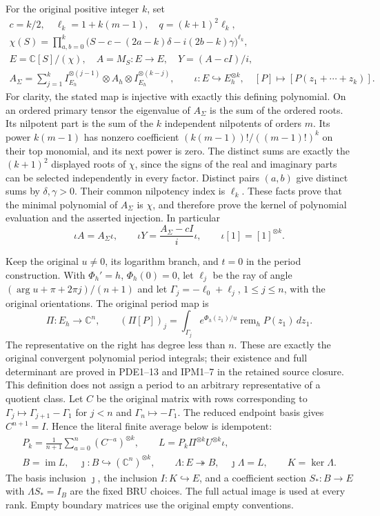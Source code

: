 For the original positive integer $k$, set
\[
\begin{gathered}
 c=k/2,\quad \ell_k=1+k(m-1),\quad q=(k+1)^2\ell_k,\\
 \chi(S)=\prod_{a,b=0}^k
   \bigl(S-c-(2a-k)\delta-i(2b-k)\gamma\bigr)^{\ell_k},\\
 E=\mathbb C[S]/(\chi),\quad A=M_S:E\to E,\quad
 Y=(A-cI)/i,\\
 A_\Sigma=\sum_{j=1}^k
      I_{E_h}^{\otimes(j-1)}\otimes A_h\otimes I_{E_h}^{\otimes(k-j)},
 \qquad
 \iota:E\hookrightarrow E_h^{\otimes k},\quad
 [P]\longmapsto[P(z_1+\cdots+z_k)].
\end{gathered}\tag{OPG2}
\]
For clarity, the stated map is injective with exactly this defining
polynomial. On an ordered primary tensor the eigenvalue of
$A_\Sigma$ is the sum of the ordered roots. Its nilpotent part is
the sum of the $k$ independent nilpotents of orders $m$.
Its power $k(m-1)$ has nonzero coefficient
$(k(m-1))!/((m-1)!)^k$ on their top monomial, and its next power
is zero. The distinct sums are exactly the $(k+1)^2$ displayed
roots of $\chi$, since the signs of the real and imaginary parts
can be selected independently in every factor. Distinct pairs
$(a,b)$ give distinct sums by $\delta,\gamma>0$. Their common
nilpotency index is $\ell_k$. These facts prove that the minimal
polynomial of $A_\Sigma$ is $\chi$, and therefore prove the
kernel of polynomial evaluation and the asserted injection.
In particular
\[
 \iota A=A_\Sigma\iota,\qquad
 \iota Y=\frac{A_\Sigma-cI}{i}\iota,\qquad
 \iota[1]=[1]^{\otimes k}.
 \tag{OPG3}
\]

Keep the original $u\ne0$, its logarithm branch, and $t=0$ in
the period construction. With $\Phi_h'=h$, $\Phi_h(0)=0$,
let $\ell_j$ be the ray of angle
$(\arg u+\pi+2\pi j)/(n+1)$ and let
$\Gamma_j=-\ell_0+\ell_j$, $1\leq j\leq n$, with the original
orientations. The original period map is
\[
 \Pi:E_h\to\mathbb C^n,\qquad
 (\Pi[P])_j=\int_{\Gamma_j}e^{\Phi_h(z_1)/u}
                    \operatorname{rem}_h P(z_1)\,dz_1.
 \tag{OPG4}
\]
The representative on the right has degree less than $n$. These
are exactly the original convergent polynomial period integrals;
their existence and full determinant are proved in PDE1--13 and
IPM1--7 in the retained source closure. This definition does not
assign a period to an arbitrary representative of a quotient class.
Let $C$ be the original matrix with rows corresponding to
$\Gamma_j\mapsto\Gamma_{j+1}-\Gamma_1$ for $j<n$ and
$\Gamma_n\mapsto-\Gamma_1$. The reduced endpoint basis gives
$C^{n+1}=I$. Hence the literal finite average below is idempotent:
\[
\begin{gathered}
 P_k=\frac1{n+1}\sum_{a=0}^{n}(C^{-a})^{\otimes k},\qquad
 L=P_k\Pi^{\otimes k}U^{\otimes k}\iota,\\
 B=\operatorname{im}L,\quad\jmath:B\hookrightarrow(\mathbb C^n)^{\otimes k},
 \qquad\Lambda:E\twoheadrightarrow B,\quad\jmath\Lambda=L,
 \qquad K=\ker\Lambda.
\end{gathered}\tag{OPG5}
\]
The basis inclusion $\jmath$, the inclusion $I:K\hookrightarrow E$,
and a coefficient section $S_*:B\to E$ with $\Lambda S_*=I_B$
are the fixed BRU choices. The full actual image is used at every
rank. Empty boundary matrices use the original empty conventions.

